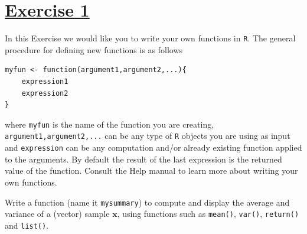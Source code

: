 \documentclass[a4paper,12pt]{article}\usepackage[]{graphicx}\usepackage[]{color}
\def\bx{\mathbf{x}}
\begin{document}
%


\begin{center}
\bigskip

\bigskip

\bigskip

\bigskip

\bigskip

\bigskip


\bigskip

\bigskip

\bigskip
\end{center}



\setlength{\parskip}{1ex plus 0.5ex minus 0.2ex}
\parindent=0cm
\setlength{\parskip}{1ex plus 0.5ex minus 0.2ex}
\linespread{1.1}
\sloppy

\section{\underline{Exercise 1}}

In this Exercise we would like you to write your own functions in \texttt{R}. The general procedure for defining new functions is as follows
\begin{center}
\begin{verbatim}
myfun <- function(argument1,argument2,...){
    expression1
    expression2
}
\end{verbatim}
\end{center}
where \texttt{myfun} is the name of the function you are creating, \texttt{argument1,argument2,...} can be any type of \texttt{R} objects you are using as input and \texttt{expression} can be any computation and/or already existing function applied to the arguments. By default the result of the last expression is the returned value of the function. Consult the Help manual to learn more about writing your own functions.

\medskip
Write a function (name it \verb"mysummary") to compute and display the average and variance of a (vector) sample $\bx$, using functions such as
\verb"mean()", \verb"var()", \verb"return()" and \verb"list()".
\end{document}
